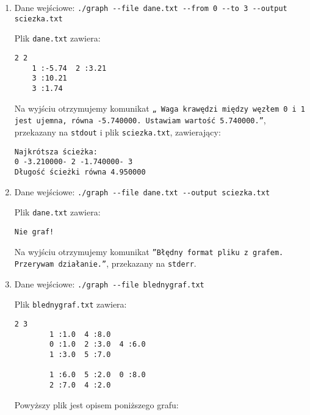\documentclass[]{article}
\begin{document}
\begin{enumerate}
    \item Dane wejściowe: \texttt{./graph -{}-file dane.txt -{}-from 0 -{}-to 3 -{}-output sciezka.txt}
    
Plik \texttt{dane.txt} zawiera:
\begin{verbatim}
2 2
    1 :-5.74  2 :3.21
    3 :10.21
    3 :1.74
\end{verbatim}
Na wyjściu otrzymujemy komunikat \texttt{„ Waga krawędzi między węzłem 0 i 1 jest ujemna, równa -5.740000. Ustawiam wartość 5.740000.”}, przekazany na \texttt{stdout} i plik \texttt{sciezka.txt}, zawierający:
\begin{verbatim}
Najkrótsza ścieżka: 
0 -3.210000- 2 -1.740000- 3
Długość ścieżki równa 4.950000
\end{verbatim}
    \item Dane wejściowe: \texttt{./graph -{}-file dane.txt -{}-output sciezka.txt}

Plik \texttt{dane.txt} zawiera:
\begin{verbatim}
Nie graf!
\end{verbatim}
Na wyjściu otrzymujemy komunikat \texttt{”Błędny format pliku z grafem. Przerywam działanie.”}, przekazany na \texttt{stderr}.

    \item Dane wejściowe: \texttt{./graph -{}-file blednygraf.txt}
    
Plik \texttt{blednygraf.txt} zawiera:
\begin{verbatim}
2 3
        1 :1.0  4 :8.0
        0 :1.0  2 :3.0  4 :6.0
        1 :3.0  5 :7.0

        1 :6.0  5 :2.0  0 :8.0
        2 :7.0  4 :2.0
\end{verbatim}
Powyższy plik jest opisem poniższego grafu:
\begin{figure}
\centering
\end{figure}
\end{enumerate}
\end{document}
